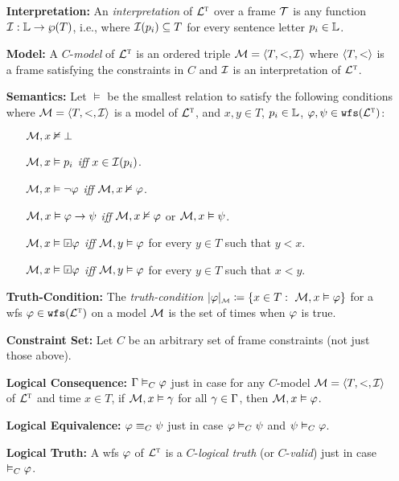 \documentclass[a4paper, 11pt]{article} %
\begin{document}
\begin{enumerate}[leftmargin=1.2in] %
  \item[\bf Interpretation:] An \textit{interpretation} of $\TL$ over a frame $\T$ is any function $\I : \SL \to \wp(T)$, i.e., where $\I(p_i) \subseteq T$ for every sentence letter $p_i \in \SL$.
	\item[\bf Model:] A $C$-\textit{model} of $\TL$ is an ordered triple $\M = \tuple{T, <, \I}$ where $\tuple{T, <}$ is a frame satisfying the constraints in $C$ and $\I$ is an interpretation of $\TL$.
  \item[\bf Semantics:] Let $\vDash$ be the smallest relation to satisfy the following conditions where $\M = \tuple{T, <, \I}$ is a model of $\TL$, and $x, y \in T$, $p_i \in \SL$, $\metaA, \metaB \in \wfs{\TL}$:
    \begin{itemize}[leftmargin=.15in]\small
      \item[] $\M, x \nvDash \bot$
      \item[] $\M, x \vDash p_i$ \textit{iff} $x \in \I(p_i)$.
      \item[] $\M, x \vDash \neg \metaA$ \textit{iff} $\M, x\nvDash \metaA$.
      \item[] $\M, x \vDash \metaA\rightarrow \metaB$ \textit{iff} $\M, x\nvDash \metaA$ or $\M, x \vDash  \metaB$.
      \item[] $\M, x \vDash \Past \metaA$ \textit{iff} $\M, y\vDash \metaA$ for every $y \in T$ such that $y < x$.
      \item[] $\M, x \vDash \Future \metaA$ \textit{iff} $\M, y\vDash \metaA$ for every $y \in T$ such that $x < y$.
    \end{itemize}
  \item[\bf Truth-Condition:] The \textit{truth-condition} $\interpret{\M}{\metaA} \coloneq \set{x \in T: ~\M, x \vDash \metaA}$ for a wfs $\metaA \in \wfs{\TL}$ on a model $\M$ is the set of times when $\metaA$ is true.
  \item[\bf Constraint Set:] Let $C$ be an arbitrary set of frame constraints (not just those above).
  \item[\bf Logical Consequence:] $\MetaG \MLmodels[C] \metaA$ just in case for any $C$-model $\M = \tuple{T, <, \I}$ of $\TL$ and time $x \in T$, if $\M, x \vDash \metaG$ for all $\metaG \in \MetaG$, then $\M, x \vDash \metaA$.
  \item[\bf Logical Equivalence:] $\metaA \MLequiv[C] \metaB$ just in case $\metaA \MLmodels[C] \metaB$ and $\metaB \MLmodels[C] \metaA$.
  \item[\bf Logical Truth:] A wfs $\metaA$ of $\TL$ is a $C$-\textit{logical truth} (or $C$-\textit{valid}) just in case $\MLmodels[C] \metaA$.

\end{enumerate}
\end{document}
